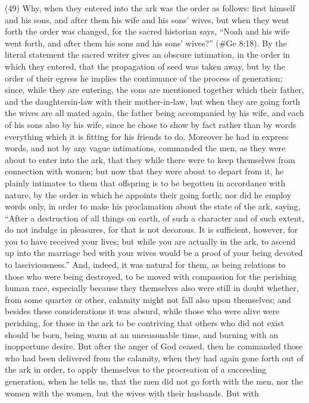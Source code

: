 (49) Why, when they entered into the ark was the order as follows: first himself and his sons, and
after them his wife and his sons' wives, but when they went forth the order was changed, for the
sacred historian says, ``Noah and his wife went forth, and after them his sons and his sons'
wives?'' (\#Ge 8:18). By the literal statement the sacred writer gives an obscure intimation, in
the order in which they entered, that the propagation of seed was taken away, but by the order of
their egress he implies the continuance of the process of generation; since, while they are
entering, the sons are mentioned together which their father, and the daughtersin-law with their
mother-in-law, but when they are going forth the wives are all mated again, the father being
accompanied by his wife, and each of his sons also by his wife, since he chose to show by fact
rather than by words everything which it is fitting for his friends to do. Moreover he had in express
words, and not by any vague intimations, commanded the men, as they were about to enter into the
ark, that they while there were to keep themselves from connection with women; but now that they
were about to depart from it, he plainly intimates to them that offspring is to be begotten in
accordance with nature, by the order in which he appoints their going forth; nor did he employ
words only, in order to make his proclamation about the state of the ark, saying, ``After a
destruction of all things on earth, of such a character and of such extent, do not indulge in
pleasures, for that is not decorous. It is sufficient, however, for you to have received your lives; but
while you are actually in the ark, to ascend up into the marriage bed with your wives would be a
proof of your being devoted to lasciviousness.'' And, indeed, it was natural for them, as being
relations to those who were being destroyed, to be moved with compassion for the perishing
human race, especially because they themselves also were still in doubt whether, from some
quarter or other, calamity might not fall also upon themselves; and besides these considerations it
was absurd, while those who were alive were perishing, for those in the ark to be contriving that
others who did not exist should be born, being warm at an unreasonable time, and burning with an
inopportune desire. But after the anger of God ceased, then he commanded those who had been
delivered from the calamity, when they had again gone forth out of the ark in order, to apply
themselves to the procreation of a succeeding generation, when he tells us, that the men did not go
forth with the men, nor the women with the women, but the wives with their husbands. But with
